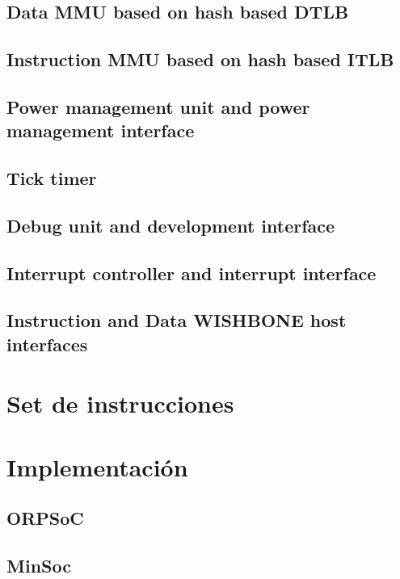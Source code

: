 \documentclass[a4paper,11pt]{article}
\begin{document}
	
	
	\subsection{Data MMU based on hash based DTLB}
	
	
	\subsection{Instruction MMU based on hash based ITLB}
	
	
	\subsection{Power management unit and power management interface}
	
	
	\subsection{Tick timer}
	
	
	\subsection{Debug unit and development interface}
	
	
	\subsection{Interrupt controller and interrupt interface}
	
	
	\subsection{Instruction and Data WISHBONE host interfaces}
	
	
	
	\section{Set de instrucciones}
	
	
	
	\section{Implementación}
		\subsection{ORPSoC}
		\subsection{MinSoc}
\end{document}
